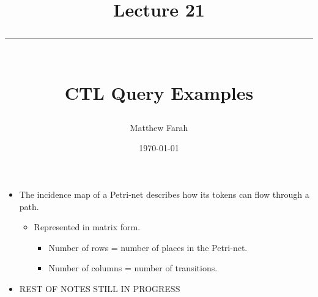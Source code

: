 \documentclass{article}
\date{
	\vspace{-.75em}
	{\large \today}
}
\title{
	\vspace*{-1.5em}
	{\Huge Lecture 21} \\
	\vspace{-1em}
	\rule{\textwidth/4}{.01em} \\
	\vspace{-.25em}
	{\Large CTL Query Examples}
	\vspace{-.75em}
}
\author{
	{\large Matthew Farah}
}
\newcounter{example}
\begin{document}
\maketitle
\pagestyle{fancy}

\fi

\begin{itemize}
	\item The incidence map of a Petri-net describes how its tokens can flow through a path.
	\begin{itemize}
		\item Represented in matrix form.
		\begin{itemize}
			\item Number of rows = number of places in the Petri-net.
			\item Number of columns = number of transitions.
		\end{itemize}
	\end{itemize}
	\item REST OF NOTES STILL IN PROGRESS
\end{itemize}

\ifdefined\iscombined
	\newpage
\else
	
\end{document}
